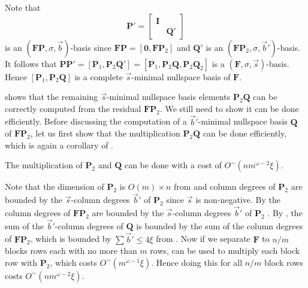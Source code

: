 \begin{pf}
Note that 
\[
\mathbf{P}'=\begin{bmatrix}\mathbf{I}\\
 & \mathbf{Q}'
\end{bmatrix}
\]
 is an $\left(\mathbf{F}\mathbf{P},\sigma,\vec{b}\right)$-basis since
$\mathbf{F}\mathbf{P}=\left[\mathbf{0},\mathbf{F}\mathbf{P}_{2}\right]$
and $\mathbf{Q}'$ is an $\left(\mathbf{F}\mathbf{P}_{2},\sigma,\vec{b}'\right)$-basis.
It follows that $\mathbf{P}\mathbf{P}'=\left[\mathbf{P}_{1},\mathbf{P}_{2}\mathbf{Q}'\right]=\left[\mathbf{P}_{1},\mathbf{P}_{2}\mathbf{Q},\mathbf{P}_{2}\mathbf{Q}_{2}\right]$
is a $\left(\mathbf{F},\sigma,\vec{s}\right)$-basis. Hence $\left[\mathbf{P}_{1},\mathbf{P}_{2}\mathbf{Q}\right]$
is a complete $\vec{s}$-minimal nullspace basis of $\mathbf{F}$.
\end{pf}
 shows that
the remaining $\vec{s}$-minimal nullspace basis elements $\mathbf{P}_{2}\mathbf{Q}$
can be correctly computed from the residual $\mathbf{F}\mathbf{P}_{2}$.
We still need to show it can be done efficiently. Before discussing
the computation of a $\vec{b}'$-minimal nullspace basis $\mathbf{Q}$
of $\mathbf{F}\mathbf{P}_{2}$, let us first show that the multiplication
$\mathbf{P}_{2}\mathbf{Q}$ can be done efficiently, which is again
a corollary of .
\begin{lem}
\label{cor:multiplyingP2Q}The multiplication of $\mathbf{P}_{2}$
and $\mathbf{Q}$ can be done with a cost of $O^{\sim}\left(nm^{\omega-2}\xi\right)$.\end{lem}
\begin{pf}
Note that the dimension of $\mathbf{P}_{2}$ is $O(m)\times n$ from
and column
degrees of $\mathbf{P}_{2}$ are bounded by the $\vec{s}$-column
degrees $\vec{b}'$ of $\mathbf{P}_{2}$ since $\vec{s}$ is non-negative.
By  the column degrees of $\mathbf{F}\mathbf{P}_{2}$
are bounded by the $\vec{s}$-column degrees $\vec{b}'$ of $\mathbf{P}_{2}$
. By ,
the sum of the $\vec{b}'$-column degrees of $\mathbf{Q}$ is bounded
by the sum of the column degrees of $\mathbf{F}\mathbf{P}_{2}$, which
is bounded by $\sum\vec{b}'\le4\xi$ from .
Now if we separate $\mathbf{F}$ to $n/m$ blocks rows each with no
more than $m$ rows,  can
be used to multiply each block row with $\mathbf{P}_{2}$, which costs
$O^{\sim}(m^{\omega-1}\xi)$. Hence doing this for all $n/m$ block
rows costs $O^{\sim}\left(nm^{\omega-2}\xi\right)$.
\end{pf}

